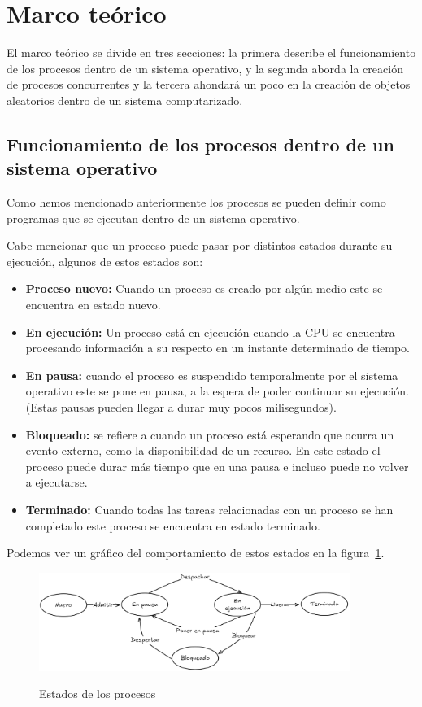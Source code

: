 \section{Marco teórico}
El marco teórico se divide en tres secciones: la primera describe el funcionamiento de los procesos dentro de un sistema operativo, y la segunda aborda la creación de procesos concurrentes y la tercera ahondará un poco en la creación de objetos aleatorios dentro de un sistema computarizado.

\subsection{Funcionamiento de los procesos dentro de un sistema operativo}
Como hemos mencionado anteriormente los procesos se pueden definir como programas que se ejecutan dentro de un sistema operativo.

Cabe mencionar que un proceso puede pasar por distintos estados durante su ejecución, algunos de estos estados son:
\begin{itemize}
    \item \textbf{Proceso nuevo:} Cuando un proceso es creado por algún medio este se encuentra en estado nuevo.
    \item \textbf{En ejecución:} Un proceso está en ejecución cuando la CPU se encuentra procesando información a su respecto en un instante determinado de tiempo.
    \item \textbf{En pausa:} cuando el proceso es suspendido temporalmente por el sistema operativo este se pone en pausa, a la espera de poder continuar su ejecución. (Estas pausas pueden llegar a durar muy pocos milisegundos).
    \item \textbf{Bloqueado:} se refiere a cuando un proceso está esperando que ocurra un evento externo, como la disponibilidad de un recurso. En este estado el proceso puede durar más tiempo que en una pausa e incluso puede no volver a ejecutarse.
    \item \textbf{Terminado:} Cuando todas las tareas relacionadas con un proceso se han completado este proceso se encuentra en estado terminado.
\end{itemize}

Podemos ver un gráfico del comportamiento de estos estados en la figura~\ref{fig:estadosDeProcesos}.

\begin{figure}[!ht]
    \centering
    \caption{Estados de los procesos}
    \includegraphics[width=0.9\textwidth]{src/images/Estados de procesos.png}\label{fig:estadosDeProcesos}
\end{figure}

